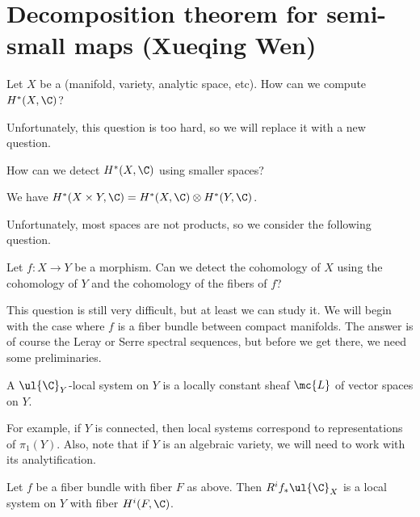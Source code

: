 \section{Decomposition theorem for semi-small maps (Xueqing Wen)}%
\label{sec:Decomposition theorem for semi-small maps (Xueqing Wen)}

\begin{quest}
    Let \(X\) be a (manifold, variety, analytic space, etc). How can we compute \(H^*(X, \C)\)?
\end{quest}

Unfortunately, this question is too hard, so we will replace it with a new question.

\begin{quest}
    How can we detect \(H^*(X, \C)\) using smaller spaces?
\end{quest}

\begin{thm}
    We have \(H^*(X \times Y, \C) = H^*(X, \C) \otimes H^*(Y, \C)\).
\end{thm}

Unfortunately, most spaces are not products, so we consider the following question.

\begin{quest}
    Let \(f \colon X \to Y\) be a morphism. Can we detect the cohomology of \(X\) using the cohomology of \(Y\) and the cohomology of the fibers of \(f\)?
\end{quest}

This question is still very difficult, but at least we can study it. We will begin with the case where \(f\) is a fiber bundle between compact manifolds. The answer is of course the Leray or Serre spectral sequences, but before we get there, we need some preliminaries.

\begin{defn}
    A \(\ul{\C}_Y\)-local system on \(Y\) is a locally constant sheaf \(\mc{L}\) of vector spaces on \(Y\).
\end{defn}

For example, if \(Y\) is connected, then local systems correspond to representations of \(\pi_1(Y)\). Also, note that if \(Y\) is an algebraic variety, we will need to work with its analytification.

\begin{exm}
    Let \(f\) be a fiber bundle with fiber \(F\) as above. Then \(R^i f_* \ul{\C}_X\) is a local system on \(Y\) with fiber \(H^i(F, \C)\).
\end{exm}

